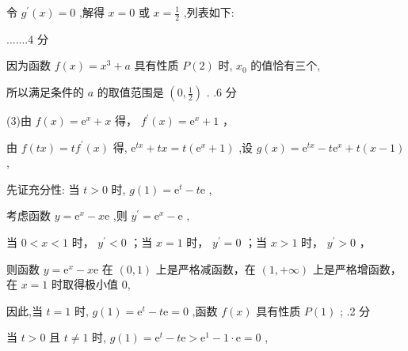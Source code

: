 \documentclass[10pt]{article}
\begin{document}
令 \({g}^{\prime }\left( x\right)  = 0\) ,解得 \(x = 0\) 或 \(x = \frac{1}{2}\) ,列表如下:

\begin{center}
\end{center}

.......4 分

因为函数 \(f\left( x\right)  = {x}^{3} + a\) 具有性质 \(P\left( 2\right)\) 时, \({x}_{0}\) 的值恰有三个,

所以满足条件的 \(a\) 的取值范围是 \(\left( {0,\frac{1}{2}}\right)\) . .6 分

(3)由 \(f\left( x\right)  = {\mathrm{e}}^{x} + x\) 得， \({f}^{\prime }\left( x\right)  = {\mathrm{e}}^{x} + 1\) ，

由 \(f\left( {tx}\right)  = t{f}^{\prime }\left( x\right)\) 得, \({\mathrm{e}}^{tx} + {tx} = t\left( {{\mathrm{e}}^{x} + 1}\right)\) ,设 \(g\left( x\right)  = {\mathrm{e}}^{tx} - t{\mathrm{e}}^{x} + t\left( {x - 1}\right)\) ,

先证充分性: 当 \(t > 0\) 时, \(g\left( 1\right)  = {\mathrm{e}}^{t} - t\mathrm{e}\) ,

考虑函数 \(y = {\mathrm{e}}^{x} - x\mathrm{e}\) ,则 \({y}^{\prime } = {\mathrm{e}}^{x} - \mathrm{e}\) ,

当 \(0 < x < 1\) 时， \({y}^{\prime } < 0\) ；当 \(x = 1\) 时， \({y}^{\prime } = 0\) ；当 \(x > 1\) 时， \({y}^{\prime } > 0\) ，

则函数 \(y = {\mathrm{e}}^{x} - x\mathrm{e}\) 在 \(\left( {0,1}\right)\) 上是严格减函数，在 \(\left( {1, + \infty }\right)\) 上是严格增函数，在 \(x = 1\) 时取得极小值 0,

因此,当 \(t = 1\) 时, \(g\left( 1\right)  = {\mathrm{e}}^{t} - t\mathrm{e} = 0\) ,函数 \(f\left( x\right)\) 具有性质 \(P\left( 1\right)\) ; .2 分

当 \(t > 0\) 且 \(t \neq  1\) 时, \(g\left( 1\right)  = {\mathrm{e}}^{t} - t\mathrm{e} > {\mathrm{e}}^{1} - 1 \cdot  \mathrm{e} = 0\) ,
\end{document}
